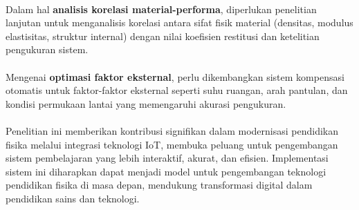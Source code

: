 \paragraph{}Dalam hal \textbf{analisis korelasi material-performa}, diperlukan penelitian lanjutan untuk menganalisis korelasi antara sifat fisik material (densitas, modulus elastisitas, struktur internal) dengan nilai koefisien restitusi dan ketelitian pengukuran sistem.

\paragraph{}Mengenai \textbf{optimasi faktor eksternal}, perlu dikembangkan sistem kompensasi otomatis untuk faktor-faktor eksternal seperti suhu ruangan, arah pantulan, dan kondisi permukaan lantai yang memengaruhi akurasi pengukuran.

\paragraph{}Penelitian ini memberikan kontribusi signifikan dalam modernisasi pendidikan fisika melalui integrasi teknologi IoT, membuka peluang untuk pengembangan sistem pembelajaran yang lebih interaktif, akurat, dan efisien. Implementasi sistem ini diharapkan dapat menjadi model untuk pengembangan teknologi pendidikan fisika di masa depan, mendukung transformasi digital dalam pendidikan sains dan teknologi.